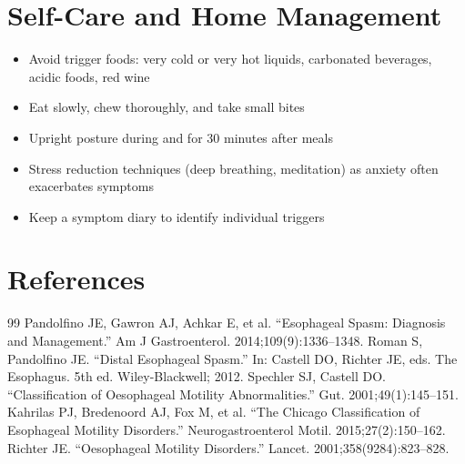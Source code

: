 \section*{Self-Care and Home Management}
\begin{itemize}
  \item Avoid trigger foods: very cold or very hot liquids, carbonated beverages, acidic foods, red wine
  \item Eat slowly, chew thoroughly, and take small bites
  \item Upright posture during and for 30 minutes after meals
  \item Stress reduction techniques (deep breathing, meditation) as anxiety often exacerbates symptoms
  \item Keep a symptom diary to identify individual triggers
\end{itemize}

\section*{References}
\begin{thebibliography}{99}
 Pandolfino JE, Gawron AJ, Achkar E, et al. ``Esophageal Spasm: Diagnosis and Management.'' Am J Gastroenterol. 2014;109(9):1336--1348.
 Roman S, Pandolfino JE. ``Distal Esophageal Spasm.'' In: Castell DO, Richter JE, eds. The Esophagus. 5th ed. Wiley-Blackwell; 2012.
 Spechler SJ, Castell DO. ``Classification of Oesophageal Motility Abnormalities.'' Gut. 2001;49(1):145--151.
 Kahrilas PJ, Bredenoord AJ, Fox M, et al. ``The Chicago Classification of Esophageal Motility Disorders.'' Neurogastroenterol Motil. 2015;27(2):150--162.
 Richter JE. ``Oesophageal Motility Disorders.'' Lancet. 2001;358(9284):823--828.
\end{thebibliography}

